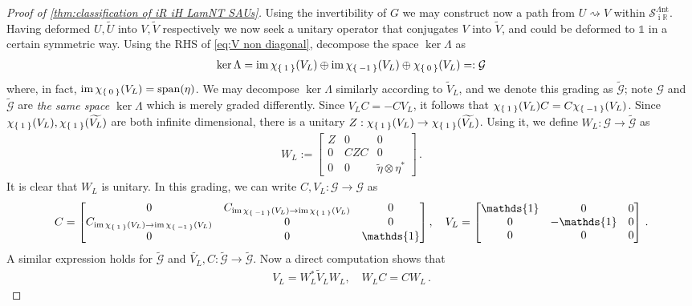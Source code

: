 \documentclass[a4paper,10pt]{article}
\numberwithin{equation}{section}
\theoremstyle{plain}
\theoremstyle{plain}
\theoremstyle{plain}
\theoremstyle{plain}
\theoremstyle{plain}
\theoremstyle{remark}
\theoremstyle{definition}
\theoremstyle{plain}
\newcommand{\ii}{\operatorname{i}}
\newcommand{\RR}{\mathbb{R}}
\newcommand{\calG}{\mathcal{G}}
\newcommand{\calSU}{\mathcal{S}}
\newcommand{\ti}[1]{\widetilde{#1}}
\newcommand{\LamNT}{\Lambda\mathrm{nt}}
\newcommand{\LamNTSAU}{\calSU^{\LamNT}}
\newcommand{\szpan}{\operatorname{span}}
\newcommand{\Id}{\mathds{1}}
\newcommand{\im}{\operatorname{im}}
\newcommand{\eq}[1]{\begin{align*}#1\end{align*}}
\begin{document}
\begin{proof}[Proof of \cref{thm:classification of iR iH LamNT SAUs}]
		Using the invertibility of $G$ we may construct now a path from $U\rightsquigarrow V$ within $\LamNTSAU_{\ii\RR}$. Having deformed $U,\ti U$ into $V,\ti{V}$ respectively we now seek a unitary operator that conjugates $V$ into $\ti{V}$, and could be deformed to $\Id$ in a certain symmetric way. Using the RHS of \cref{eq:V non diagonal}, decompose the space $\ker\Lambda$ as \eq{\ker\Lambda = \im \chi_{\Set{1}}(V_{L}) \oplus \im \chi_{\Set{-1}}(V_{L}) \oplus \chi_{\Set{0}}(V_{L})=:\calG} where, in fact, $\im \chi_{\Set{0}}(V_{L})=\szpan(\eta)$. We may decompose $\ker \Lambda$ similarly according to $\ti{V}_{L}$, and we denote this grading as $\ti\calG$; note $\calG$ and $\ti\calG$ are \emph{the same space $\ker\Lambda$} which is merely graded differently. Since $V_LC=-CV_L$, it follows that $\chi_{\Set{1}}(V_{L})C=C \chi_{\Set{-1}}(V_{L})$. Since $\chi_{\Set{1}}(V_{L}),\chi_{\Set{1}}(\ti {V_{L}})$ are both infinite dimensional, there is a unitary $Z:\chi_{\Set{1}}(V_{L})\to\chi_{\Set{1}}(\ti{V_{L}})$. Using it, we define $W_L:\calG\to\ti\calG$ as \eq{W_L:=\begin{bmatrix}Z & 0 & 0 \\ 0 & CZC & 0 \\ 0 & 0 & \ti\eta\otimes\eta^\ast\end{bmatrix}\,.}
		It is clear that $W_L$ is unitary. In this grading, we can write $C,V_L:\calG\to\calG$ as \eq{C=\begin{bmatrix}0 & C_{\im \chi_{\Set{-1}}(V_{L})\to\im \chi_{\Set{1}}(V_{L})} & 0 \\ C_{\im \chi_{\Set{1}}(V_{L})\to\im \chi_{\Set{-1}}(V_{L})} & 0 & 0 \\ 0 & 0 & \Id\end{bmatrix},\quad V_L=\begin{bmatrix}\Id & 0 & 0 \\ 0 & -\Id & 0 \\ 0 & 0 & 0\end{bmatrix}\,.} A similar expression holds for $\ti \calG$ and $\ti{V_L},C:\ti\calG\to\ti\calG$. Now a direct computation shows that \eq{V_{L}=W_{L}^\ast\ti{V}_{L}W_{L},\quad W_{L}C=C W_{L}\,.} 
		

\end{proof}
\end{document}
